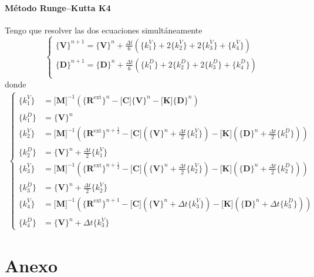 \documentclass[11pt, a4paper,titlepage]{article}
\newcommand{\Mme}[1]{\boldsymbol{[}\mathbf{#1} \boldsymbol{]}}
\newcommand{\Cme}[1]{\boldsymbol{\{ }\mathbf{#1} \boldsymbol{\}} }
\newcommand{\Cmen}[1]{\boldsymbol{\{ }#1 \boldsymbol{\}} }
\newcommand{\kuD}{\Cmen{k_1^{\dot{D}}}}
\newcommand{\kdD}{\Cmen{k_2^{\dot{D}}}}
\newcommand{\ktD}{\Cmen{k_3^{\dot{D}}}}
\newcommand{\kcD}{\Cmen{k_4^{\dot{D}}}}
\newcommand{\kuV}{\Cmen{k_1^{\dot{V}}}}
\newcommand{\kdV}{\Cmen{k_2^{\dot{V}}}}
\newcommand{\ktV}{\Cmen{k_3^{\dot{V}}}}
\newcommand{\kcV}{\Cmen{k_4^{\dot{V}}}}
\newcommand{\MK}{\Mme{K}}
\newcommand{\MC}{\Mme{C}}
\begin{document}
\subsection*{Método Runge--Kutta K4}
Tengo que resolver las dos ecuaciones simultáneamente
\[
\begin{cases}
	\Cme{V}^{n+1}=\Cme{V}^n + \frac{\Delta t}{6} \left( \kuV + 2\kdV + 2\ktV + \kcV \right) \\
	\Cme{D}^{n+1}=\Cme{D}^n + \frac{\Delta t}{6} \left( \kuD + 2\kdD + 2\ktD + \kcD \right) \\
\end{cases}
\]
donde 
\begin{align*}
	\begin{cases}
	\kuV &= \Mme{M}^{-1} \left( \Cme{R^{\mathrm{ext}}}^n - \MC \Cme{V}^n - \MK \Cme{D}^n  \right) \\
	\kuD &= \Cme{V}^n \\\hline
	\kdV &= \Mme{M}^{-1} \left( \Cme{R^{\mathrm{ext}}}^{n+\frac{1}{2}} - \MC \left(\Cme{V}^n + \frac{\Delta t}{2} \kuV \right) - \MK \left( \Cme{D}^n + \frac{\Delta t}{2} \kuD \right)  \right) \\
	\kdD &= \Cme{V}^n + \frac{\Delta t}{2} \kuV \\	\hline
	\ktV &= \Mme{M}^{-1} \left( \Cme{R^{\mathrm{ext}}}^{n+\frac{1}{2}} - \MC \left(\Cme{V}^n + \frac{\Delta t}{2} \kdV \right) - \MK \left( \Cme{D}^n + \frac{\Delta t}{2} \kdD \right)  \right) \\
	\ktD &= \Cme{V}^n + \frac{\Delta t}{2} \kdV \\	\hline
	\kcV &= \Mme{M}^{-1} \left( \Cme{R^{\mathrm{ext}}}^{n+1} - \MC \left(\Cme{V}^n + \Delta t \ktV \right) - \MK \left( \Cme{D}^n + \Delta t \ktD \right)  \right) \\
	\kcD &= \Cme{V}^n + \Delta t \ktV
	\end{cases}
\end{align*}


\part{Anexo}
\end{document}
